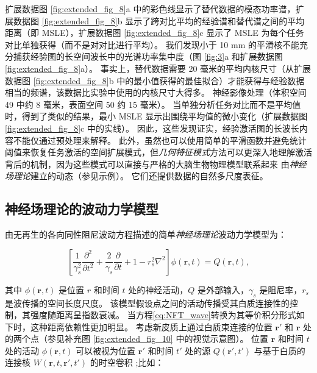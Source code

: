 \documentclass[lang=cn,a4paper,newtx]{elegantpaper}
\begin{document}
扩展数据图 \ref{fig:extended_fig_8}a 中的彩色线显示了替代数据的模态功率谱，扩展数据图 \ref{fig:extended_fig_8}b 显示了跨对比平均的经验谱和替代谱之间的平均距离（即 MSLE），扩展数据图 \ref{fig:extended_fig_8}c 显示了 MSLE 为每个任务对比单独获得（而不是对对比进行平均）。
我们发现小于 10 mm 的平滑核不能充分捕获经验图的长空间波长中的光谱功率集中度（图 \ref{fig:3}a 和扩展数据图 \ref{fig:extended_fig_8}a）。
事实上，替代数据需要 20 毫米的平均内核尺寸（从扩展数据图 \ref{fig:extended_fig_8}b 中的最小值获得的最佳拟合）才能获得与经验数据相当的频谱，该数据比实验中使用的内核尺寸大得多。
神经影像处理（体积空间 49 中约 8 毫米，表面空间 50 约 15 毫米）。
当单独分析任务对比而不是平均值时，得到了类似的结果，最小 MSLE 显示出围绕平均值的微小变化（扩展数据图 \ref{fig:extended_fig_8}c 中的实线）。
因此，这些发现证实，经验激活图的长波长内容不能仅通过预处理来解释。
此外，虽然也可以使用简单的平滑函数并避免统计阈值来恢复任务激活的空间扩展模式，但\textit{几何特征模式}方法可以更深入地理解激活背后的机制，因为这些模式可以直接与严格的大脑生物物理模型联系起来 由\textit{神经场理论}建立的动态（参见示例\cite{robinson1997propagation,robinson2016eigenmodes,jones1999golgi,wang2016brain}）。
它们还提供数据的自然多尺度表征。



\subsection{神经场理论的波动力学模型} \label{sec:NFT_wave}

由无再生的各向同性阻尼波动方程描述的简单\textit{神经场理论}波动力学模型为：

\begin{equation}\label{eq:NFT_wave}
	[\frac{1}{\gamma_s^2} \frac{\partial ^2}{\partial t^2} +
	\frac{2}{\gamma_s} \frac{\partial}{\partial t} + 
	1 - r_s^2 \nabla^2
	]
	\phi(\boldsymbol{r}, t)
	= Q(\boldsymbol{r}, t),
\end{equation}


其中 $ \phi(\boldsymbol{r},t) $ 是位置 $ r $ 和时间 $ t $ 处的神经活动，$ Q $ 是外部输入，$ \gamma_s $ 是阻尼率，$ r_s $ 是波传播的空间长度尺度。
该模型假设点之间的活动传播受其白质连接性的控制，其强度随距离呈指数衰减。
当方程\ref{eq:NFT_wave}转换为其等价积分形式如下时，这种距离依赖性更加明显。
考虑新皮质上通过白质束连接的位置 $ \boldsymbol{r}' $ 和 $ \boldsymbol{r} $ 处的两个点（参见补充图 \ref{fig:extended_fig_10} 中的视觉示意图）。
位置 $ \boldsymbol{r} $ 和时间 $ t $ 处的活动 $ \phi(\boldsymbol{r},t) $ 可以被视为位置 $ \boldsymbol{r}' $ 和时间 $ t' $ 处的源 $ Q(\boldsymbol{r}',t') $ 与基于白质的连接核 $ W(\boldsymbol{r}, t, \boldsymbol{r}', t') $ 的时空卷积 ;比如：
\end{document}
